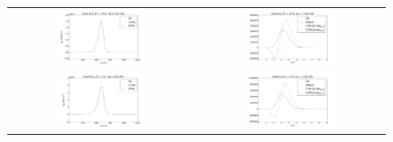 \documentclass[preprint,12pt]{elsarticle}
\begin{document}
\begin{figure}[tbh]
  \begin{center}
    \begin{tabular}{cc}
      \includegraphics[width=0.5\textwidth]{../results/fe_analysis/figs/P5_heatfluxes_niZ10_Kn5e-4.png} &
      \includegraphics[width=0.5\textwidth]{../results/fe_analysis/figs/P5_kinetics_niZ10_Kn5e-4.png} \\
      \includegraphics[width=0.5\textwidth]{../results/fe_analysis/figs/P5_heatfluxes_niZ5_Kn2e-3.png} &
      \includegraphics[width=0.5\textwidth]{../results/fe_analysis/figs/P5_kinetics_niZ5_Kn2e-3.png} \\

\end{tabular}
\end{center}
\end{figure}
\end{document}
